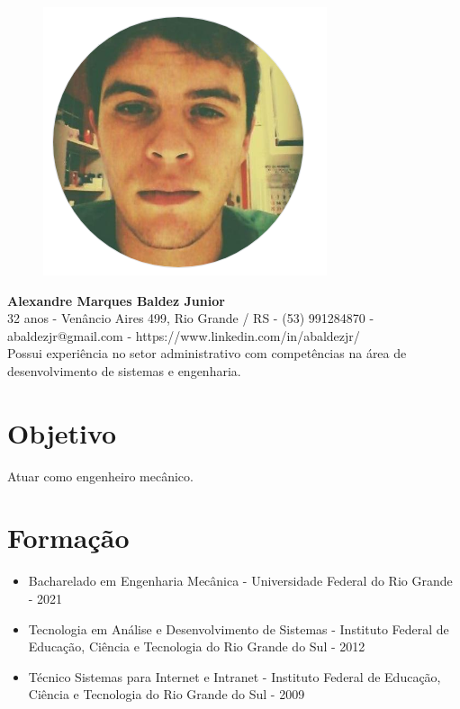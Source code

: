 \documentclass[11pt,oneside,a4paper]{article}
\begin{document}
    \thispagestyle{empty}
    \begin{figure}
        \centering
        \includegraphics[scale = 0.3]{img/perfil-red.png}        
    \end{figure}
    \begin{flushleft}
    \textbf{\Large {Alexandre Marques Baldez Junior}}\\
    \vspace{0.5cm}
    32 anos - Venâncio Aires 499, Rio Grande / RS - (53) 991284870 - abaldezjr@gmail.com - https://www.linkedin.com/in/abaldezjr/\\
    \vspace{0.5cm}
    Possui experiência no setor administrativo com competências na área de desenvolvimento de sistemas e engenharia.\\
    \end{flushleft}    
    \section*{Objetivo}
    Atuar como engenheiro mecânico.
    \section*{Formação}
    \begin{itemize}
        \item Bacharelado em Engenharia Mecânica - Universidade Federal do Rio Grande - 2021
        \item Tecnologia em Análise e Desenvolvimento de Sistemas - Instituto Federal de Educação, Ciência e Tecnologia do Rio Grande do Sul - 2012
        \item Técnico Sistemas para Internet e Intranet - Instituto Federal de Educação, Ciência e Tecnologia do Rio Grande do Sul - 2009
    \end{itemize}
\end{document}
